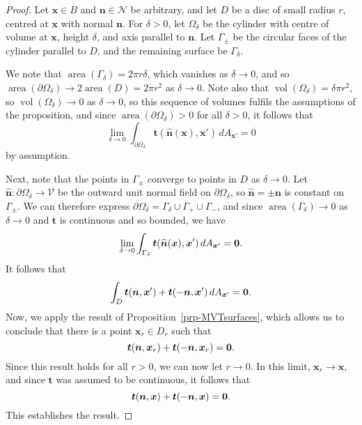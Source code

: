 \documentclass[
  letterpaper,
  DIV=11,
  numbers=noendperiod]{scrreprt}
\theoremstyle{plain}
\theoremstyle{remark}
\begin{document}
\begin{proof}
Let \({\boldsymbol{x}}\in B\) and \({\boldsymbol{n}}\in{\mathcal{N}}\)
be arbitrary, and let \(D\) be a disc of small radius \(r\), centred at
\({\boldsymbol{x}}\) with normal \({\boldsymbol{n}}\). For \(\delta>0\),
let \(\Omega_\delta\) be the cylinder with centre of volume at
\({\boldsymbol{x}}\), height \(\delta\), and axis parallel to
\({\boldsymbol{n}}\). Let \(\Gamma_{\pm}\) be the circular faces of the
cylinder parallel to \(D\), and the remaining surface be
\(\Gamma_\delta\).

We note that \({\operatorname{area}}(\Gamma_\delta) = 2\pi r\delta\),
which vanishes as \(\delta\to0\), and so
\({\operatorname{area}}(\partial\Omega_\delta)\to 2{\operatorname{area}}(D) = 2\pi r^2\)
as \(\delta\to0\). Note also that
\({\operatorname{vol}}(\Omega_\delta) = \delta \pi r^2\), so
\({\operatorname{vol}}(\Omega_\delta)\to0\) as \(\delta\to0\), so this
sequence of volumes fulfils the assumptions of the proposition, and
since \({\operatorname{area}}(\partial\Omega_\delta)>0\) for all
\(\delta>0\), it follows that
\[\lim_{\delta\to0}\int_{\partial\Omega_\delta} {\boldsymbol{t}}(\widehat{{\boldsymbol{n}}}({\boldsymbol{x}}),{\boldsymbol{x}}')\,dA_{{\boldsymbol{x}}'}=0\]
by assumption.

Next, note that the points in \(\Gamma_\pm\) converge to points in \(D\)
as \(\delta\to0\). Let
\(\widehat{{\boldsymbol{n}}}:\partial\Omega_\delta\to{\mathcal{V}}\) be
the outward unit normal field on \(\partial\Omega_\delta\), so
\(\widehat{{\boldsymbol{n}}}=\pm{\boldsymbol{n}}\) is constant on
\(\Gamma_{\pm}\). We can therefore express
\(\partial\Omega_\delta = \Gamma_\delta\cup\Gamma_+\cup\Gamma_-\), and
since \({\operatorname{area}}(\Gamma_\delta)\to0\) as \(\delta\to0\) and
\({\boldsymbol{t}}\) is continuous and so bounded, we have
\[\lim_{\delta\to0}\int_{\Gamma_\delta} {\boldsymbol{t}}(\widehat{{\boldsymbol{n}}}({\boldsymbol{x}}),{\boldsymbol{x}}')\,dA_{{\boldsymbol{x}}'}=\bf0.\]
It follows that
\[\int_D {\boldsymbol{t}}({\boldsymbol{n}},{\boldsymbol{x}}')+{\boldsymbol{t}}(-{\boldsymbol{n}},{\boldsymbol{x}}')\,dA_{{\boldsymbol{x}}'} = \bf0.\]
Now, we apply the result of Proposition~\ref{prp-MVTsurfaces}, which
allows us to conclude that there is a point
\({\boldsymbol{x}}_r\in D_r\) such that
\[{\boldsymbol{t}}({\boldsymbol{n}},{\boldsymbol{x}}_r)+{\boldsymbol{t}}(-{\boldsymbol{n}},{\boldsymbol{x}}_r)=\bf0.\]
Since this result holds for all \(r>0\), we can now let \(r\to0\). In
this limit, \({\boldsymbol{x}}_r\to {\boldsymbol{x}}\), and since
\({\boldsymbol{t}}\) was assumed to be continuous, it follows that
\[{\boldsymbol{t}}({\boldsymbol{n}},{\boldsymbol{x}})+{\boldsymbol{t}}(-{\boldsymbol{n}},{\boldsymbol{x}})=\bf0.\]
This establishes the result.
\end{proof}
\end{document}
